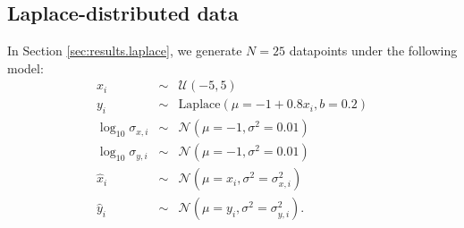 \documentclass[fleqn,usenatbib]{rasti}
\begin{document}
\subsection{Laplace-distributed data}
\label{sec:data-models.laplace}

In Section \ref{sec:results.laplace}, we generate $N = 25$ datapoints under the
following model:
\begin{eqnarray}
    x_i &\sim& \mathcal U (-5, 5) \\
    y_i &\sim& \mathrm{Laplace} (\mu = -1 + 0.8 x_i, b = 0.2) \\
    \log_{10} \sigma_{x, i} &\sim& \mathcal N (\mu = -1, \sigma^2 = 0.01) \\
    \log_{10} \sigma_{y, i} &\sim& \mathcal N (\mu = -1, \sigma^2 = 0.01) \\
    \hat{x}_i &\sim& \mathcal N (\mu = x_i, \sigma^2 = \sigma_{x, i}^2) \\
    \hat{y}_i &\sim& \mathcal N (\mu = y_i, \sigma^2 = \sigma_{y, i}^2).
\end{eqnarray}






\bsp	%
\label{lastpage}
\end{document}
